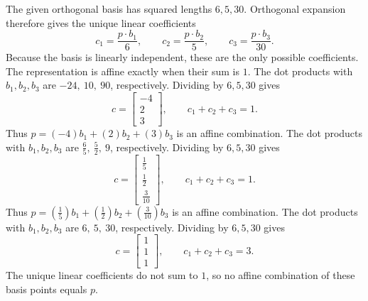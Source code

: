 The given orthogonal basis has squared lengths $6,5,30$. Orthogonal expansion therefore gives the unique linear coefficients
\[c_1=\frac{p\cdot b_1}{6},\qquad c_2=\frac{p\cdot b_2}{5},\qquad c_3=\frac{p\cdot b_3}{30}.\]
Because the basis is linearly independent, these are the only possible coefficients. The representation is affine exactly when their sum is $1$.
The dot products with $b_1,b_2,b_3$ are $-24,\ 10,\ 90$, respectively. Dividing by $6,5,30$ gives
\[c=\begin{bmatrix}-4\\2\\3\end{bmatrix},\qquad c_1+c_2+c_3=1.\]
Thus $p=(-4)b_1+(2)b_2+(3)b_3$ is an affine combination.
The dot products with $b_1,b_2,b_3$ are $\frac{6}{5},\ \frac{5}{2},\ 9$, respectively. Dividing by $6,5,30$ gives
\[c=\begin{bmatrix}\frac{1}{5}\\\frac{1}{2}\\\frac{3}{10}\end{bmatrix},\qquad c_1+c_2+c_3=1.\]
Thus $p=(\frac{1}{5})b_1+(\frac{1}{2})b_2+(\frac{3}{10})b_3$ is an affine combination.
The dot products with $b_1,b_2,b_3$ are $6,\ 5,\ 30$, respectively. Dividing by $6,5,30$ gives
\[c=\begin{bmatrix}1\\1\\1\end{bmatrix},\qquad c_1+c_2+c_3=3.\]
The unique linear coefficients do not sum to $1$, so no affine combination of these basis points equals $p$.


